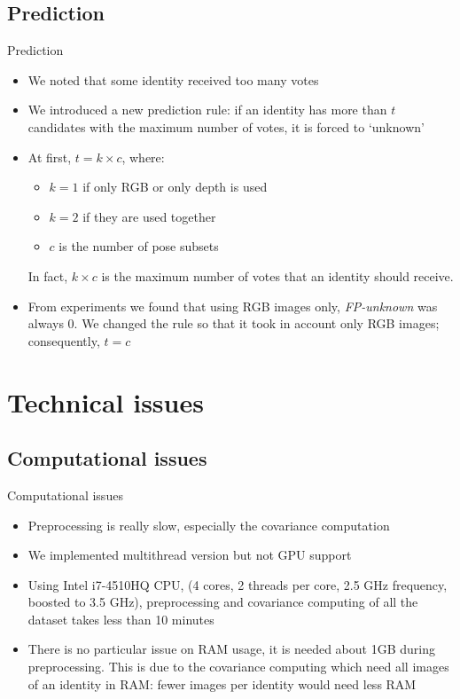 \documentclass[unknownkeysallowed]{beamer}
\begin{document}
\subsection{Prediction}
\begin{frame}{Prediction}
	\begin{itemize}
		\item We noted that some identity received too many votes
		\item We introduced a new prediction rule: if an identity has more than $t$ candidates with the maximum number of votes, it is forced to `unknown'
		\item At first, $t=k \times c$, where:
			\begin{itemize}
				\item $k=1$ if only RGB or only depth is used
				\item $k=2$ if they are used together
				\item $c$ is the number of pose subsets
			\end{itemize}
			In fact, $k \times c$ is the maximum number of votes that an identity should receive.
		\item From experiments we found that using RGB images only,	\textit{FP-unknown} was always 0. We changed the rule so that it took in account only RGB images; consequently, $t = c$

	\end{itemize}
\end{frame}

\section{Technical issues}
\subsection{Computational issues}
\begin{frame}{Computational issues}
	\begin{itemize}
		\item Preprocessing is really slow, especially the covariance computation
		\item We implemented multithread version but not GPU support
		\item Using Intel i7-4510HQ CPU, (4 cores, 2 threads per core, 2.5 GHz frequency, boosted to 3.5 GHz), preprocessing	and covariance computing of all the dataset takes less than	10 minutes
		\item There is no particular issue on RAM usage, it is needed about 1GB during preprocessing. This is due to the covariance computing which need all images of an identity in RAM: fewer images per identity would need less RAM
	\end{itemize}
\end{frame}
\end{document}
